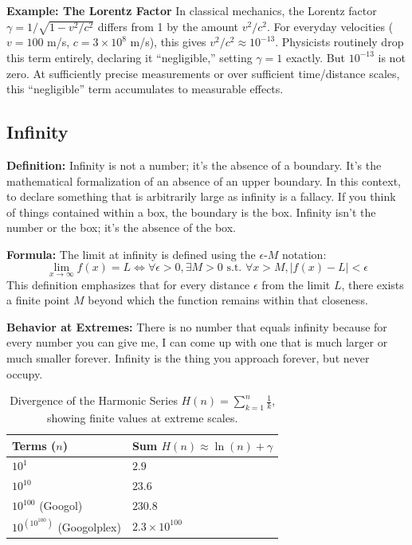 \documentclass[twoside,twocolumn,9pt]{article}
\begin{document}
\noindent\textbf{Example: The Lorentz Factor}
In classical mechanics, the Lorentz factor $\gamma = 1/\sqrt{1 - v^2/c^2}$ differs from 1 by the amount $v^2/c^2$. For everyday velocities ($v = 100$ m/s, $c = 3\times10^{8}$ m/s), this gives $v^2/c^2 \approx 10^{-13}$. Physicists routinely drop this term entirely, declaring it ``negligible,'' setting $\gamma = 1$ exactly. But $10^{-13}$ is not zero. At sufficiently precise measurements or over sufficient time/distance scales, this ``negligible'' term accumulates to measurable effects.

\subsection{Infinity}
\textbf{Definition:}
Infinity is not a number; it's the absence of a boundary. It's the mathematical formalization of an absence of an upper boundary. In this context, to declare something that is arbitrarily large as infinity is a fallacy. If you think of things contained within a box, the boundary is the box. Infinity isn't the number or the box; it's the absence of the box.

\noindent\textbf{Formula:}
The limit at infinity is defined using the $\epsilon$-$M$ notation:
\begin{equation}
\lim_{x \to \infty} f(x) = L \iff \forall \epsilon > 0, \exists M > 0 \text{ s.t. } \forall x > M, |f(x) - L| < \epsilon
\end{equation}
This definition emphasizes that for every distance $\epsilon$ from the limit $L$, there exists a finite point $M$ beyond which the function remains within that closeness.

\noindent\textbf{Behavior at Extremes:}
There is no number that equals infinity because for every number you can give me, I can come up with one that is much larger or much smaller forever. Infinity is the thing you approach forever, but never occupy.

\begin{table}[H]
\centering
\caption{Divergence of the Harmonic Series $H(n) = \sum_{k=1}^n \frac{1}{k}$, showing finite values at extreme scales.}
\begin{tabular}{ll}
\toprule
Terms ($n$) & Sum $H(n) \approx \ln(n) + \gamma$ \\
\midrule
$10^{1}$ & $2.9$ \\
$10^{10}$ & $23.6$ \\
$10^{100}$ (Googol) & $230.8$ \\
$10^{(10^{100})}$ (Googolplex) & $2.3 \times 10^{100}$ \\
\bottomrule
\end{tabular}
\end{table}
\end{document}
